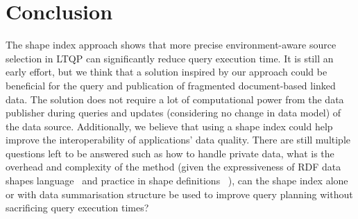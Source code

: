 \section{Conclusion}

The shape index approach shows that more precise environment-aware source selection in LTQP can significantly reduce query execution time.
It is still an early effort, but we think that a solution inspired by our approach could be beneficial for the query and publication of fragmented document-based linked data.
The solution does not require a lot of computational power from the data publisher during queries and updates (considering no change in data model) of the data source.
Additionally, we believe that using a shape index could help improve the interoperability of applications' data quality.
There are still multiple questions left to be answered such as how to handle private data, what is the overhead and complexity of the method (given the expressiveness of RDF data shapes language~\cite{Delva2021, staworko_et_al:LIPIcs:2015:4985, 10.1007/978-3-319-68288-4_7} and practice in shape definitions~\cite{lieber_iswc_poster_2020, staworko_et_al:LIPIcs:2015:4985, Staworko2018ContainmentOS} ),
can the shape index alone or with data summarisation structure be used to improve query planning without sacrificing query execution times?
